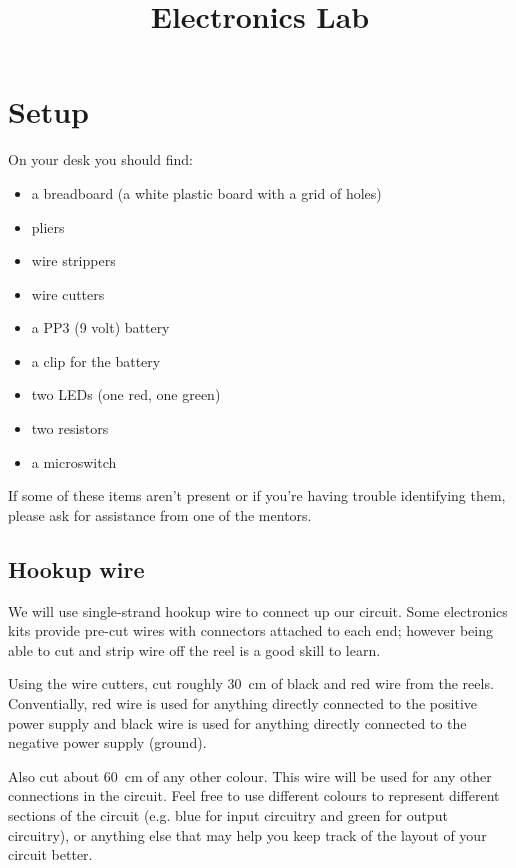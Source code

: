 \documentclass{article}
\title{Electronics Lab}
\begin{document}
\listoftodos
\newpage

\maketitle


\section{Setup}

On your desk you should find:

\begin{itemize}
\item a breadboard (a white plastic board with a grid of holes)
\item pliers
\item wire strippers
\item wire cutters
\item a PP3 (9 volt) battery
\item a clip for the battery
\item two LEDs (one red, one green)
\item two resistors
\item a microswitch
\end{itemize}


If some of these items aren't present or if you're having trouble identifying
them, please ask for assistance from one of the mentors.

\subsection{Hookup wire}

We will use single-strand hookup wire to connect up our circuit. Some
electronics kits provide pre-cut wires with connectors attached to each end;
however being able to cut and strip wire off the reel is a good skill to learn.

Using the wire cutters, cut roughly \SI{30}{\centi\metre} of black and red wire
from the reels. Conventially, red wire is used for anything directly connected
to the positive power supply and black wire is used for anything directly
connected to the negative power supply (ground).

Also cut about \SI{60}{\centi\metre} of any other colour. This wire will be used
for any other connections in the circuit. Feel free to use different colours to
represent different sections of the circuit (e.g. blue for input circuitry and
green for output circuitry), or anything else that may help you keep track of
the layout of your circuit better.
\end{document}
